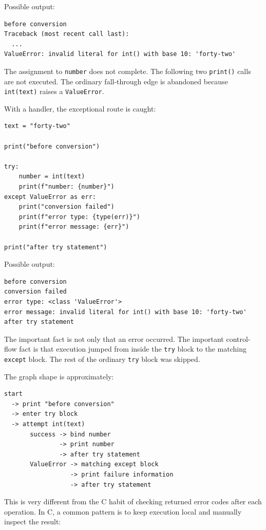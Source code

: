 \documentclass[a4paper,twoside]{report}
\begin{document}
Possible output:

\begin{verbatim}
before conversion
Traceback (most recent call last):
  ...
ValueError: invalid literal for int() with base 10: 'forty-two'
\end{verbatim}

The assignment to \texttt{number} does not complete. The following two \texttt{print()} calls are not executed. The ordinary fall-through edge is abandoned because \texttt{int(text)} raises a \texttt{ValueError}.

With a handler, the exceptional route is caught:

\begin{verbatim}
text = "forty-two"

print("before conversion")

try:
    number = int(text)
    print(f"number: {number}")
except ValueError as err:
    print("conversion failed")
    print(f"error type: {type(err)}")
    print(f"error message: {err}")

print("after try statement")
\end{verbatim}

Possible output:

\begin{verbatim}
before conversion
conversion failed
error type: <class 'ValueError'>
error message: invalid literal for int() with base 10: 'forty-two'
after try statement
\end{verbatim}

The important fact is not only that an error occurred. The important control-flow fact is that execution jumped from inside the \texttt{try} block to the matching \texttt{except} block. The rest of the ordinary \texttt{try} block was skipped.

The graph shape is approximately:

\begin{verbatim}
start
  -> print "before conversion"
  -> enter try block
  -> attempt int(text)
       success -> bind number
               -> print number
               -> after try statement
       ValueError -> matching except block
                  -> print failure information
                  -> after try statement
\end{verbatim}

This is very different from the C habit of checking returned error codes after each operation. In C, a common pattern is to keep execution local and manually inspect the result:
\end{document}
